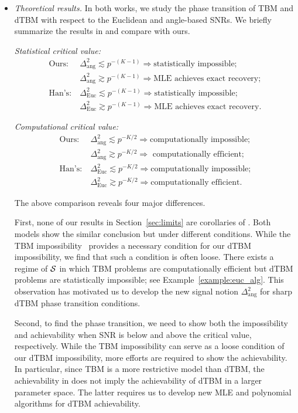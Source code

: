 \documentclass[journal]{IEEEtran}
\theoremstyle{definition}
\theoremstyle{definition}
\begin{document}
\begin{itemize}[wide]
    \item \textit{Theoretical results.} In both works, we study the phase transition of TBM and dTBM with respect to the Euclidean and angle-based SNRs. We briefly summarize the results in \cite{han2020exact} and compare with ours. 
    
    \textit{Statistical critical value:}
    \begin{align}
        \text{Ours:}& \ \Delta_{\text{ang}}^2 \lesssim p^{-(K-1)} \Rightarrow \text{statistically impossible;} \\
        & \ \Delta_{\text{ang}}^2 \gtrsim   p^{-(K-1)} \Rightarrow \text{MLE achieves exact recovery;} \\
        \text{Han's:}& \ \Delta_{\text{Euc}}^2 \lesssim p^{-(K-1)} \Rightarrow \text{statistically impossible;} \\
        &\ \Delta_{\text{Euc}}^2 \gtrsim   p^{-(K-1)} \Rightarrow \text{MLE achieves exact recovery}.
    \end{align}
    
     \textit{Computational critical value:}
    \begin{align}
        \text{Ours:}& \ \Delta_{\text{ang}}^2 \lesssim p^{-K/2} \Rightarrow \text{computationally impossible;} \\
        &\ \Delta_{\text{ang}}^2 \gtrsim   p^{-K/2} \Rightarrow \text{ computationally efficient;} \\
        \text{Han's:}& \ \Delta_{\text{Euc}}^2 \lesssim p^{-K/2} \Rightarrow \text{computationally impossible;} \\
        &\ \Delta_{\text{Euc}}^2 \gtrsim   p^{-K/2} \Rightarrow \text{computationally efficient}.
    \end{align}

    The above comparison reveals four major differences.

    First, none of our results in Section~\ref{sec:limits} are corollaries of \cite{han2020exact}. Both models show the similar conclusion but under different conditions. While the TBM impossibility~\citep{han2020exact} provides a necessary condition for our dTBM impossibility, we find that such a condition is often loose. There exists a regime of $\mathcal{S}$ in which TBM problems are computationally efficient but dTBM problems are statistically impossible; see Example~\ref{example:euc_alg}. This observation has motivated us to develop the new signal notion $\Delta^2_{\text{ang}}$ for sharp dTBM phase transition conditions.  
     
 Second, to find the phase transition, we need to show both the impossibility and achievability when SNR is below and above the critical value, respectively. While the TBM impossibility can serve as a loose condition of our dTBM impossibility, more efforts are required to show the achievability. In particular, since TBM is a more restrictive model than dTBM, the achievability in \cite{han2020exact} does not imply the achievability of dTBM in a larger parameter space. The latter requires us to develop new MLE and polynomial algorithms for dTBM achievability.


\end{itemize}
\end{document}
